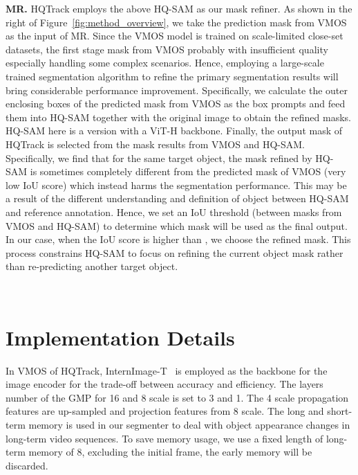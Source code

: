 \documentclass[10pt,twocolumn,letterpaper]{article}
\begin{document}
\noindent\textbf{MR.} HQTrack employs the above HQ-SAM as our mask refiner.
As shown in the right of Figure~\ref{fig:method_overview}, we take the prediction mask from VMOS as the input of MR.
Since the VMOS model is trained on scale-limited close-set datasets, the first stage mask from VMOS probably with insufficient quality especially handling some complex scenarios.
Hence, employing a large-scale trained segmentation algorithm to refine the primary segmentation results will bring considerable performance improvement.
Specifically, we calculate the outer enclosing boxes of the predicted mask from VMOS as the box prompts and feed them into HQ-SAM together with the original image to obtain the refined masks. HQ-SAM here is a version with a ViT-H backbone.
Finally, the output mask of HQTrack is selected from the mask results from VMOS and HQ-SAM. 
Specifically, we find that for the same target object, the mask refined by HQ-SAM is sometimes completely different from the predicted mask of VMOS (very low IoU score) which instead harms the segmentation performance. This may be a result of the different understanding and definition of object between HQ-SAM and reference annotation. Hence, we set an IoU threshold  (between masks from VMOS and HQ-SAM) to determine which mask will be used as the final output. In our case, when the IoU score is higher than , we choose the refined mask. This process constrains HQ-SAM to focus on refining the current object mask rather than re-predicting another target object.


 \


\section{Implementation Details}


In VMOS of HQTrack, InternImage-T~\cite{internimage} is employed as the backbone for the image encoder for the trade-off between accuracy and efficiency.
The layers number of the GMP for 16 and 8 scale is set to 3 and 1. The 4 scale propagation features are up-sampled and projection features from 8 scale.
The long and short-term memory is used in our segmenter to deal with object appearance changes in long-term video sequences.
To save memory usage, we use a fixed length of long-term memory of 8, excluding the initial frame, the early memory will be discarded. 
\end{document}

